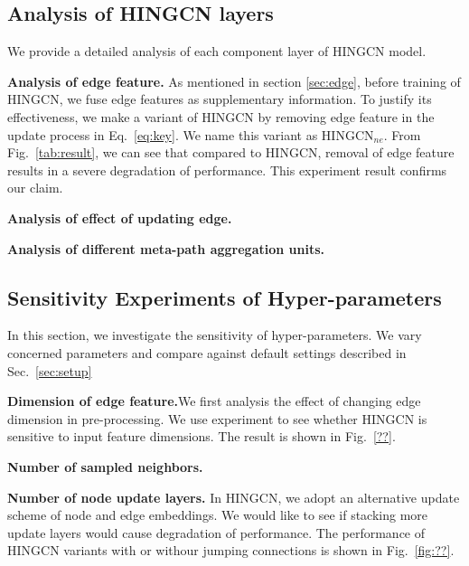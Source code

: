 \subsection{Analysis of HINGCN layers}
We provide a detailed analysis of each component layer of HINGCN model.

\textbf{Analysis of edge feature.}
As mentioned in section \ref{sec:edge}, before training of HINGCN, we fuse edge features as supplementary information. To justify its effectiveness, we make a variant of HINGCN by removing edge feature in the update process in Eq.~\ref{eq:key}. We name this variant as HINGCN$_{ne}$. From Fig.~\ref{tab:result}, we can see that compared to HINGCN, removal of edge feature results in a severe degradation of performance. This experiment result confirms our claim.

\textbf{Analysis of effect of updating edge.}

\textbf{Analysis of different meta-path aggregation units.}

\subsection{Sensitivity Experiments of Hyper-parameters}
In this section, we investigate the sensitivity of hyper-parameters. We vary concerned parameters and compare against default settings described in Sec.~\ref{sec:setup} 

\textbf{Dimension of edge feature.}We first analysis the effect of changing edge dimension in pre-processing.  We use experiment to see whether HINGCN is sensitive to input feature dimensions. The result is shown in Fig.~\ref{??}.


\textbf{Number of sampled neighbors.}

\textbf{Number of node update layers.} In HINGCN, we adopt an alternative update scheme of node and edge embeddings. We would like to see if stacking more update layers would cause degradation of performance. The performance of HINGCN variants with or withour jumping connections is shown in Fig.~\ref{fig:??}. 






